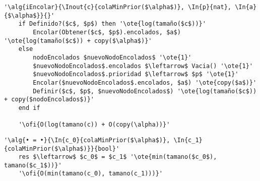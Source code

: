 	\begin{lstlisting}[mathescape]
	'\alg{iEncolar}{\Inout{c}{colaMinPrior($\alpha$)}, \In{p}{nat}, \In{a}{$\alpha$}}{}'
	if Definido?($c$, $p$) then '\ote{log(tamaño($c$))}'
		Encolar(Obtener($c$, $p$).encolados, $a$) '\ote{log(tamaño($c$)) + copy($\alpha$)}'
	else
		nodoEncolados $nuevoNodoEncolados$ '\ote{1}'
		$nuevoNodoEncolados$.encolados $\leftarrow$ Vacia() '\ote{1}'
		$nuevoNodoEncolados$.prioridad $\leftarrow$ $p$ '\ote{1}'
		Encolar($nuevoNodoEncolados$.encolados, $a$) '\ote{copy($a$)}'
		Definir($c$, $p$, $nuevoNodoEncolados$) '\ote{log(tamaño($c$)) + copy($nodoEncolados$)}'
	end if

	'\ofi{O(log(tamano(c)) + O(copy(\alpha))}'
	\end{lstlisting}

	\begin{lstlisting}[mathescape]
	'\alg{• = •}{\In{c_0}{colaMinPrior($\alpha$)}, \In{c_1}{colaMinPrior($\alpha$)}}{bool}'
	res $\leftarrow$ $c_0$ = $c_1$ '\ote{min(tamano($c_0$), tamano($c_1$))}'
	'\ofi{O(min(tamano(c_0), tamano(c_1)))}'
\end{lstlisting}